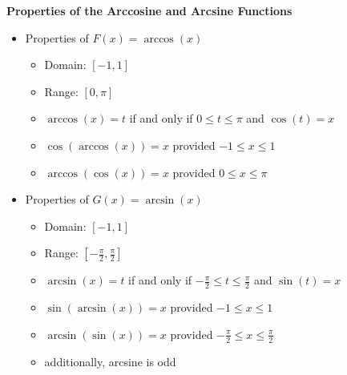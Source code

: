 \colorbox{ResultColor}{\bbm

\begin{thm} \label{arccosinesinefunctionprops}  \textbf{Properties of the Arccosine and Arcsine Functions}     

\begin{itemize}

\item  Properties of $F(x)= \arccos(x)$

\begin{itemize}

\item Domain:  $[-1,1]$

\item Range:  $[0,\pi]$

\item $\arccos(x) = t$ if and only if $0 \leq t \leq \pi$ and $\cos(t) = x$

\item $\cos(\arccos(x)) = x$ provided $-1 \leq x \leq 1$

\item $\arccos(\cos(x)) = x$ provided $0 \leq x \leq \pi$

\end{itemize}

\item  Properties of $G(x) = \arcsin(x)$

\begin{itemize}

\item Domain:  $[-1,1]$

\item Range:  $\left[ -\frac{\pi}{2}, \frac{\pi}{2}\right]$

\item $\arcsin(x) = t$ if and only if $-\frac{\pi}{2} \leq t \leq \frac{\pi}{2}$ and $\sin(t) = x$

\item $\sin(\arcsin(x)) = x$ provided $-1 \leq x \leq 1$

\item $\arcsin(\sin(x)) = x$ provided $-\frac{\pi}{2} \leq x \leq \frac{\pi}{2}$ 

\item additionally, arcsine is odd

\end{itemize}

\end{itemize}

\end{thm}

\ebm}

